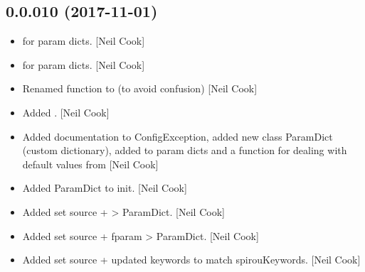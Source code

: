 \documentclass[a4paper,10pt,english]{report}
\begin{document}
\subsection{0.0.010 (2017-11-01)}
\label{\detokenize{misc/changelog:id540}}\begin{itemize}
\item {} 
 for param dicts. {[}Neil Cook{]}

\item {} 
 for param dicts. {[}Neil Cook{]}

\item {} 
Renamed  function to 
(to avoid confusion) {[}Neil Cook{]}

\item {} 
Added . {[}Neil Cook{]}

\item {} 
Added documentation to ConfigException, added new class ParamDict
(custom dictionary), added  to param dicts and a 
function for dealing with default values from  {[}Neil
Cook{]}

\item {} 
Added ParamDict to init. {[}Neil Cook{]}

\item {} 
Added set source +  \textendash{}\textgreater{} ParamDict. {[}Neil Cook{]}

\item {} 
Added set source + fparam \textendash{}\textgreater{} ParamDict. {[}Neil Cook{]}

\item {} 
Added set source + updated keywords to match spirouKeywords. {[}Neil
Cook{]}

\end{itemize}
\end{document}
